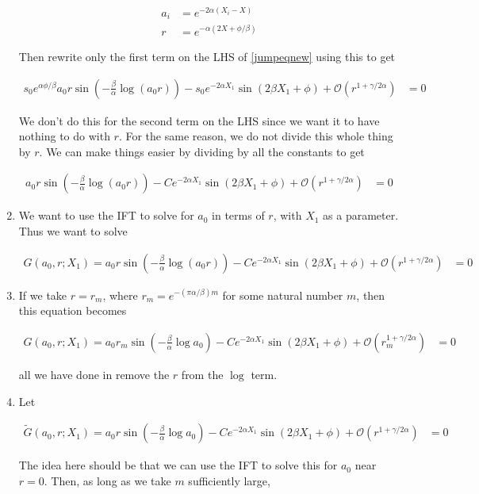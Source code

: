 \documentclass[12pt]{article}
\begin{document}
\begin{enumerate}
\begin{align}
a_i &= e^{-2 \alpha (X_i - X)} \\
r &= e^{-\alpha( 2 X + \phi / \beta ) }
\end{align}

Then rewrite only the first term on the LHS of \eqref{jumpeqnew} using this to get

\begin{align}\label{jumpeqnew}
s_0 e^{\alpha \phi / \beta } a_0 r \sin \left( - \frac{\beta}{\alpha} \log (a_0 r) \right) - s_0 e^{-2 \alpha X_1} \sin(2 \beta X_1 + \phi) + \mathcal{O}(r^{1 + \gamma / 2 \alpha}) &= 0
\end{align}

We don't do this for the second term on the LHS since we want it to have nothing to do with $r$. For the same reason, we do not divide this whole thing by $r$. We can make things easier by dividing by all the constants to get

\begin{align}\label{jumpeqnew}
a_0 r \sin \left( - \frac{\beta}{\alpha} \log (a_0 r) \right) - C e^{-2 \alpha X_1} \sin(2 \beta X_1 + \phi) + \mathcal{O}(r^{1 + \gamma / 2 \alpha}) &= 0
\end{align}

\item We want to use the IFT to solve for $a_0$ in terms of $r$, with $X_1$ as a parameter. Thus we want to solve

\begin{align*}
G(a_0, r; X_1) = 
a_0 r \sin \left( - \frac{\beta}{\alpha} \log (a_0 r) \right) - C e^{-2 \alpha X_1} \sin(2 \beta X_1 + \phi) + \mathcal{O}(r^{1 + \gamma / 2 \alpha}) &= 0
\end{align*}

\item If we take $r = r_m$, where $r_m =  e^{-(\pi \alpha / \beta) m}$ for some natural number $m$, then this equation becomes

\begin{align*}
G(a_0, r; X_1) = 
a_0 r_m \sin \left( - \frac{\beta}{\alpha} \log a_0 \right) - C e^{-2 \alpha X_1} \sin(2 \beta X_1 + \phi) + \mathcal{O}(r_m^{1 + \gamma / 2 \alpha}) &= 0
\end{align*}

all we have done in remove the $r$ from the $\log$ term.

\item Let 

\begin{align*}
\tilde{G}(a_0, r; X_1) = 
a_0 r \sin \left( - \frac{\beta}{\alpha} \log a_0 \right) - C e^{-2 \alpha X_1} \sin(2 \beta X_1 + \phi) + \mathcal{O}(r^{1 + \gamma / 2 \alpha}) &= 0
\end{align*}

The idea here should be that we can use the IFT to solve this for $a_0$ near $r = 0$. Then, as long as we take $m$ sufficiently large, 


\end{enumerate}
\end{document}
